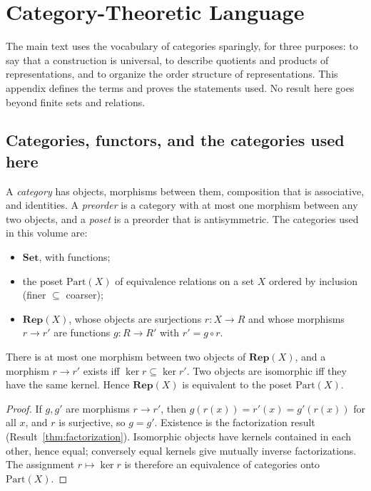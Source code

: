 \chapter{Category-Theoretic Language}\label{app:category}

The main text uses the vocabulary of categories sparingly, for three purposes: to say that a construction is universal, to describe quotients and products of representations, and to organize the order structure of representations. This appendix defines the terms and proves the statements used. No result here goes beyond finite sets and relations.

\section{Categories, functors, and the categories used here}

A \emph{category} has objects, morphisms between them, composition that is associative, and identities. A \emph{preorder} is a category with at most one morphism between any two objects, and a \emph{poset} is a preorder that is antisymmetric. The categories used in this volume are:
\begin{itemize}[nosep]
  \item $\mathbf{Set}$, with functions;
  \item the poset $\mathrm{Part}(X)$ of equivalence relations on a set $X$ ordered by inclusion (finer $\subseteq$ coarser);
  \item $\mathbf{Rep}(X)$, whose objects are surjections $r:X\to R$ and whose morphisms $r\to r'$ are functions $g:R\to R'$ with $r'=g\circ r$.
\end{itemize}

\begin{newresult}\label{pb:rep}
There is at most one morphism between two objects of $\mathbf{Rep}(X)$, and a morphism $r\to r'$ exists iff $\ker r\subseteq\ker r'$. Two objects are isomorphic iff they have the same kernel. Hence $\mathbf{Rep}(X)$ is equivalent to the poset $\mathrm{Part}(X)$.
\end{newresult}
\begin{proof}
If $g,g'$ are morphisms $r\to r'$, then $g(r(x))=r'(x)=g'(r(x))$ for all $x$, and $r$ is surjective, so $g=g'$. Existence is the factorization result (Result~\ref{thm:factorization}). Isomorphic objects have kernels contained in each other, hence equal; conversely equal kernels give mutually inverse factorizations. The assignment $r\mapsto\ker r$ is therefore an equivalence of categories onto $\mathrm{Part}(X)$.
\end{proof}


